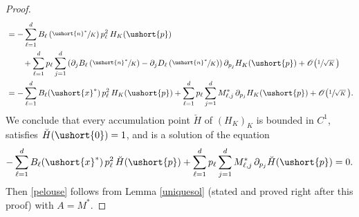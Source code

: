 \documentclass[11pt]{article}
\let\mathcal\mathscr
\numberwithin{equation}{section}
\theoremstyle{plain}
\theoremstyle{definition}
\newcommand{\sK}{K}
\newcommand{\vecnf}{\ushort{n}^*}
\newcommand{\vecxf}{\ushort{x}^*}
\newcommand{\vp}{\ushort{p}}
\begin{document}
\begin{proof}
\begin{align*}
& = -\sum_{\ell=1}^{d}B_{\ell}\left(\sfrac{\vecnf}{K}\right) p_{\ell}^2\, H_{\sK}(\vp)\\
& \qquad +\sum_{\ell=1}^{d}p_{\ell}
\sum_{j=1}^{d}\left(\partial_{j}B_{\ell}\left(\sfrac{\vecnf}{K}\right)-\partial_{j}D_{\ell}\left(\sfrac{\vecnf}{K}\right)\right)\partial_{p_{j}}H_{\sK}(\vp)+\mathcal{O}\bigl(\sfrac{1}{\sqrt{K}}\,\bigr)\\
& =-\sum_{\ell=1}^{d}B_{\ell}(\vecxf)\,p_{\ell}^2\,H_{\sK}(\vp)+\sum_{\ell=1}^{d} p_{\ell}\sum_{j=1}^{d}
M_{\ell,j}^*\,\partial_{p_{j}}H_{\sK}(\vp)+\mathcal{O}\bigl(\sfrac{1}{\sqrt{K}}\,\bigr).
\end{align*}
We conclude that every accumulation point $\breve{H}$ of $(H_{\sK})_{\sK}$ is bounded in
$C^{1}$, satisfies $\breve{H}(\ushort{0})=1$, and is a solution of the equation
\[
-\sum_{\ell=1}^{d}B_{\ell}(\vecxf)\,p_{\ell}^2\,\breve{H}(\vp)+\sum_{\ell=1}^{d} p_{\ell}\sum_{j=1}^{d}
M_{\ell,j}^*\,\partial_{p_{j}}\breve{H}(\vp)=0.
\]
Then \eqref{pelouse} follows from Lemma \ref{uniquesol} (stated and proved right after this proof) with $A=M^*$.
\end{proof}
\end{document}
